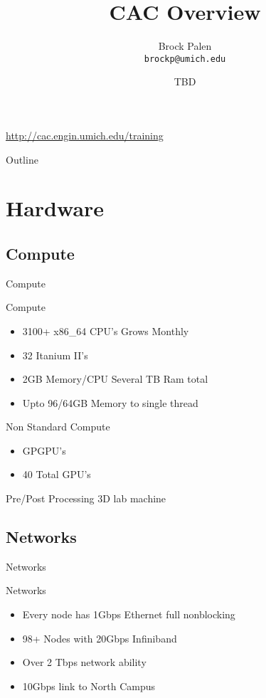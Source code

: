 \documentclass[handout]{beamer}
\title[CAC Overview] {CAC Overview}
\author{Brock Palen\\ \texttt{brockp@umich.edu}}
\date{TBD}
\begin{document}
  \begin{frame}
    \titlepage
    \url{http://cac.engin.umich.edu/training}
  \end{frame}

  \begin{frame}{Outline}
    \tableofcontents
  \end{frame}
  
  \section {Hardware}
   \subsection{Compute}
    \begin{frame}{Compute}
     \begin{block}{Compute}
      \begin{itemize}
       \item{3100+ x86\_64 CPU's Grows Monthly}
       \item{32 Itanium II's}
       \item{2GB Memory/CPU Several TB Ram total}
       \item{Upto 96/64GB Memory to single thread}
      \end{itemize}
     \end{block}
     \begin{block}{Non Standard Compute}
      \begin{itemize}
       \item<2->{GPGPU's}
       \item<2->{40 Total GPU's}
      \end{itemize}
     \end{block}
    \end{frame}
    \begin{frame}{Pre/Post Processing}
      3D lab machine
    \end{frame}
   \subsection{Networks}
    \begin{frame}{Networks}
     \begin{block}{Networks}
      \begin{itemize}
       \item Every node has 1Gbps Ethernet full nonblocking
       \item 98+ Nodes with 20Gbps Infiniband
       \item Over 2 Tbps network ability
       \item 10Gbps link to North Campus
      \end{itemize}
     \end{block}
    \end{frame}
\end{document}

